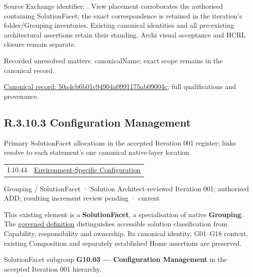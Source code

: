 Source Exchange identifier: \texttt{}. View placement corroborates
the authorised containing SolutionFacet; the exact correspondence is retained in the
iteration's folder/Grouping inventories. Existing canonical identities and all
pre-existing architectural assertions retain their standing. Archi visual
acceptance and HCRL closure remain separate.


{\small Recorded unresolved matters: canonicalName; exact scope remains in the canonical record.}\par
{\footnotesize \href{../../../../../../../continuum/grouping/50a4cb6b01c94904a0991175ab09004c.md}{Canonical record: 50a4cb6b01c94904a0991175ab09004c}; full qualifications and provenance.}\par
\subsection*{R.3.10.3 Configuration Management}
\label{navigation:R.3.10.3}

Primary SolutionFacet allocations in the accepted Iteration 001 register; links resolve to each statement’s one canonical native-layer location.\par
\begin{longtable}{p{.22\linewidth}p{.73\linewidth}}
I.10.44 & \hyperref[element:48e5415eff454e3e9e987506999e62f2]{Environment-Specific Configuration} \\
\end{longtable}
\label{element:ef476f07cd9e4ba6bdac99dc6e940baa}
{\small Grouping / SolutionFacet · Solution Architect-reviewed Iteration 001; authorised ADD; resulting increment review pending · current}\par

This existing element is a \textbf{SolutionFacet}, a specialisation of native
\textbf{Grouping}. The \href{\detokenize{../../../../../../../governance/continuum-representation.md#solutionfacet-classification--1119-candidate}}{governed definition}
distinguishes accessible solution classification from Capability, responsibility
and ownership. Its canonical identity, G01–G18 context, existing Composition
and separately established Home assertions are preserved.



SolutionFacet subgroup \textbf{G10.03 — Configuration Management} in the accepted Iteration 001 hierarchy.



